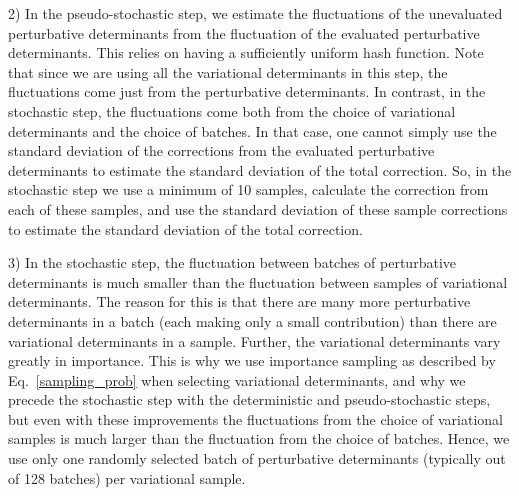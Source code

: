 \documentclass[%
reprint,
 superscriptaddress,
 amsmath,amssymb,
 aps,
]{revtex4-1}
\begin{document}
2) In the pseudo-stochastic step, we estimate the fluctuations of the unevaluated perturbative determinants from the fluctuation of the evaluated perturbative determinants.
This relies on having a sufficiently uniform hash function.
Note that since we are using all the variational determinants in this step,
the fluctuations come just from the perturbative determinants.
In contrast, in the stochastic step, the fluctuations come both from the choice of variational determinants and the choice of batches.
In that case, one cannot simply use the standard deviation of the corrections from the evaluated perturbative determinants to estimate the standard deviation of the total correction.
So, in the stochastic step we use a minimum of 10 samples, calculate the correction from each of these samples,
and use the standard deviation of these sample corrections to estimate the standard deviation of the total correction.

{\color{black}
3) In the stochastic step, the fluctuation between batches of perturbative determinants is much smaller than the fluctuation
between samples of variational determinants.
The reason for this is that there are many more perturbative determinants in a batch (each making
only a small contribution) than there are variational determinants in a sample.
Further, the variational determinants vary greatly in importance.
This is why we use importance sampling as described by Eq.~\ref{sampling_prob} when selecting variational determinants,
and why we precede the stochastic step with the deterministic and pseudo-stochastic steps, but
even with these improvements the fluctuations from the choice of variational samples
is much larger than the fluctuation from the choice of batches.
Hence, we use only one randomly selected batch of perturbative determinants (typically out of 128 batches)
per variational sample.
}
\end{document}
